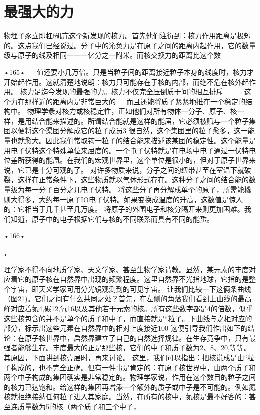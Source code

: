 \section{最强大的力}

物埋子豕立即杠f矶亢这个新发现的核力。首先他们注衍到：核力作用距离是极短的。这点我们巳经说过。分子中的沁奂力是在原子之间的距离内起作用，它的数量级与原子的线及相同一一一亿分之一附米。而核交换力的距离比这个数

•165•
  
值还要小几万倍。只是当粒子间的距离接近粒子本身的线度时，核力才开始起作用。这就清楚地说朗：核力只可能存在于核的内部，而绝不危在核外起作用。
核力足迄今发现的最强的力。核力不仅完全压倒质于间的相互排斥－－－这个力在那样近的距离内是非常巨大的－~而且还能将质子紧紧地推在一个稳定的结构中。
物理学彖对核力或核稳定性，正如他们对所有物体一分子、原子、核一样，是用结合能来描述的。所谓结合能就是这样的能届，它必须被赋与一个粒子集团以便将这个渠团分解成它的粒子成员3
很自然，这个集团里的粒子愈多，这一能量也就愈大。因此我们常取钧一粒子的结合能来描述该某团的稳定性。这个能量是用电子伏特这个特殊单位来屈度的。一个屯子伏特就是在电场中电子通过一伏特电位差所获得的能凰。在我们的宏观世界里，这个单位是很小的，但对于原子世界来说，它已是十分可观的了。
对许多物质来说，分子之间的纽带甚至在室温下就破裂，这样在正常条件下，这些物质就以气休形式存在。这种分子之间的结合能的数量级为每一分子百分之几电子伏特。
将这些分子再分解成单个的原子，所需能橇则大得多，大约每一原子IO电子伏特。如果变换成温度的升高，这数值是惊人的：它相当于几千甚至几万度。
将原子的外围电子和核分隔开来则更加困难。我们知逍，原子中的电子根据它们与核的不同联系而具有不同的能蜇。

•166•

，
 
理学家不得不向地质学家、天文学家、甚至生物学家请教。显然，某元素的丰度对应着它的原子核在自然界中出现的频繁程度。这里自然界不光指地球，它指的是整个宇宙，即天义学家可用分光镜观测到的可见宇宙。
让我们比较一下这俩条曲线（图21)。它们之间有什么共同之处？首先，在左侧的角落我们看到上曲线的最高峰对应着氮4,碳12,氧16以及其他若干元索的核。所有这些数字都是4的倍数，似乎这些核包含的并不是单个的质子和中子，而直接就是“粒子。下曲线与之柜对应的部分，标示出这些元素在自然界中的相对上度接近100%
这便引导我们作出如下的结论：在原子核世界中，启然界建立了自己的自然选择规律。在生存竟争中，只有最强者能够生存。丰度最大的正是那些核，它们的中子和质子数为2、8、20,等等。其原因，下面讲到核壳层时，再来讨论。
这里，我们可以指出：把核说成是由“粒子构成的，也不完全正确。但有一件事是肯定的：在原子核世界中，由两个质子和两个中子构成的集团确实是非常稳定的。物理学家说，作用在这个数目的粒子之间的核力已达饱和。给这样的集团再增添一个额外的质子或中子是不可能的。例如氮核就拒绝接纳任何粒子进入其家庭。当然，在所有的核中，氮核是最不好客的：甚至连质量数为5的核（两个质子和三个中子，

